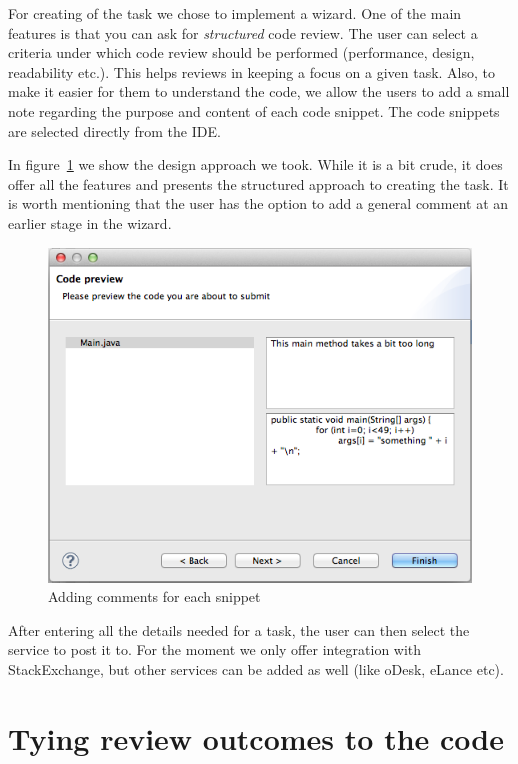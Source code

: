 \documentclass{sigchi}
\begin{document}
For creating of the task we chose to implement a wizard. One of the main features is that you can ask
for \emph{structured} code review. The user can select a criteria under which code review should be
performed (performance, design, readability etc.). This helps reviews in keeping a focus on a given task.
Also, to make it easier for them to understand the code, we allow the users to add a small note regarding
the purpose and content of each code snippet. The code snippets are selected directly from the IDE.

In figure~\ref{fig:wizard} we show the design approach we took. While it is a bit crude, it does offer all
the features and presents the structured approach to creating the task. It is worth mentioning that the user
has the option to add a general comment at an earlier stage in the wizard.

\begin{figure}[hbt]
	\includegraphics[width=\columnwidth]{wizard.png}
\caption{Adding comments for each snippet}
\label{fig:wizard}
\end{figure}

After entering all the details needed for a task, the user can then select the service to post it to. For the
moment we only offer integration with StackExchange, but other services can be added as well (like
oDesk, eLance etc). 

\section{Tying review outcomes to the code}
\end{document}
